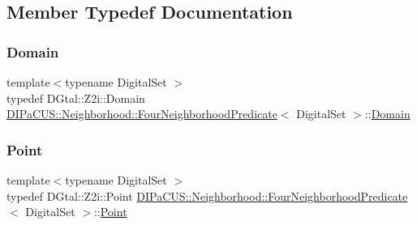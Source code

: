 \subsection{Member Typedef Documentation}
\mbox{\label{classDIPaCUS_1_1Neighborhood_1_1FourNeighborhoodPredicate_acf2e866035c770ff120fa4ef6ee841f2}} 
\subsubsection{\texorpdfstring{Domain}{Domain}}
{\footnotesize\ttfamily template$<$typename Digital\+Set $>$ \\
typedef D\+Gtal\+::\+Z2i\+::\+Domain \mbox{\hyperlink{classDIPaCUS_1_1Neighborhood_1_1FourNeighborhoodPredicate}{D\+I\+Pa\+C\+U\+S\+::\+Neighborhood\+::\+Four\+Neighborhood\+Predicate}}$<$ Digital\+Set $>$\+::\mbox{\hyperlink{classDIPaCUS_1_1Neighborhood_1_1FourNeighborhoodPredicate_acf2e866035c770ff120fa4ef6ee841f2}{Domain}}}

\mbox{\label{classDIPaCUS_1_1Neighborhood_1_1FourNeighborhoodPredicate_abc0e0bbbb71884290b4b61935c296230}} 
\subsubsection{\texorpdfstring{Point}{Point}}
{\footnotesize\ttfamily template$<$typename Digital\+Set $>$ \\
typedef D\+Gtal\+::\+Z2i\+::\+Point \mbox{\hyperlink{classDIPaCUS_1_1Neighborhood_1_1FourNeighborhoodPredicate}{D\+I\+Pa\+C\+U\+S\+::\+Neighborhood\+::\+Four\+Neighborhood\+Predicate}}$<$ Digital\+Set $>$\+::\mbox{\hyperlink{classDIPaCUS_1_1Neighborhood_1_1FourNeighborhoodPredicate_abc0e0bbbb71884290b4b61935c296230}{Point}}}



